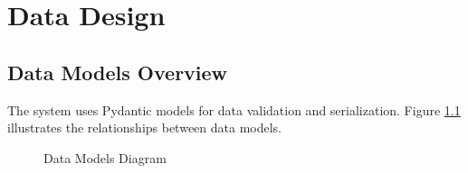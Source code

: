 \documentclass[12pt,a4paper]{report}
\begin{document}

\chapter{Data Design}

\section{Data Models Overview}

The system uses Pydantic models for data validation and serialization. Figure \ref{fig:data-models} illustrates the relationships between data models.

\begin{figure}[H]
    \centering
    \caption{Data Models Diagram}
    \label{fig:data-models}
\end{figure}
\end{document}
